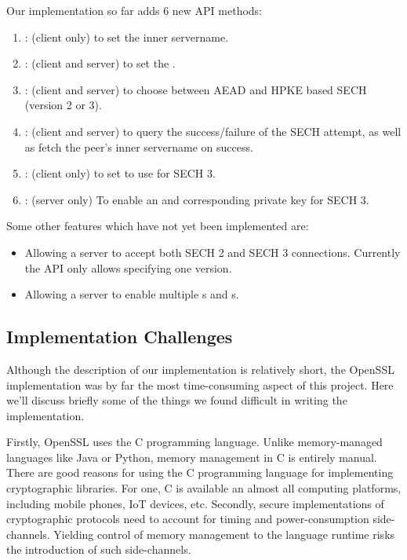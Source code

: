 Our implementation so far adds 6 new \ac{API} methods:
\begin{enumerate}
    \item {}: (client only) to set the inner servername.
    \item {}: (client and server) to set the \varsechlongtermkey{}.
    \item {}: (client and server) to choose between \ac{AEAD} and \ac{HPKE} based \ac{SECH} (version 2 or 3).
    \item {}: (client and server) to query the success/failure of the \ac{SECH} attempt, as well as fetch the peer's inner servername on success.
    \item {}: (client only) to set  to use for \ac{SECH} 3.
    \item {}: (server only) To enable an  and corresponding private key for \ac{SECH} 3.
\end{enumerate}

Some other features which have not yet
been implemented are:
\begin{itemize}
    \item Allowing a server to accept both \ac{SECH} 2 and \ac{SECH} 3 connections. Currently the  \ac{API} only allows specifying one version.
    \item Allowing a server to enable multiple \varsechlongtermkey{}s and s.
\end{itemize}

\subsection{Implementation Challenges}
Although the description of our implementation is relatively short,
the OpenSSL implementation was by far the most time-consuming aspect of this project.
Here we'll discuss briefly some of the things we found difficult
in writing the implementation.

Firstly, OpenSSL uses the C programming language.
Unlike memory-managed languages like Java or Python,
memory management in C is entirely manual.
There are good reasons for using the C programming language
for implementing cryptographic libraries.
For one, C is available an almost all computing platforms,
including mobile phones, IoT devices, etc.
Secondly, secure implementations of cryptographic protocols need to account
for timing and power-consumption side-channels.
Yielding control of memory management to the language runtime
risks the introduction of such side-channels.

